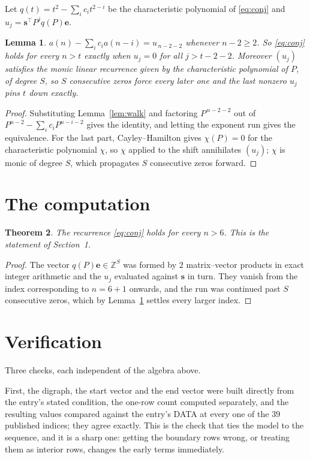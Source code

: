 \documentclass[11pt,a4paper]{article}
\theoremstyle{plain}
\newtheorem{theorem}{Theorem}
\newtheorem{lemma}[theorem]{Lemma}
\theoremstyle{definition}
\begin{document}
Let $q(t)=t^{2}-\sum_i c_i t^{2-i}$ be the characteristic polynomial of
\eqref{eq:conj} and $u_j=\mathbf{s}^{\!\top}P^{j}q(P)\mathbf{e}$.

\begin{lemma}\label{lem:crit}
$a(n)-\sum_i c_i a(n-i)=u_{\,n-2-2}$ whenever $n-2\ge2$. So \eqref{eq:conj}
holds for every $n>t$ exactly when $u_j=0$ for all $j>t-2-2$. Moreover $(u_j)$
satisfies the monic linear recurrence given by the characteristic polynomial of $P$, of
degree $S$, so $S$ consecutive zeros force every later one and the last nonzero $u_j$ pins
$t$ down exactly.
\end{lemma}

\begin{proof}
Substituting Lemma~\ref{lem:walk} and factoring $P^{\,n-2-2}$ out of
$P^{n-2}-\sum_i c_i P^{n-i-2}$ gives the identity, and letting the exponent run gives the
equivalence. For the last part, Cayley--Hamilton gives $\chi(P)=0$ for the characteristic
polynomial $\chi$, so $\chi$ applied to the shift annihilates $(u_j)$; $\chi$ is monic of
degree $S$, which propagates $S$ consecutive zeros forward.
\end{proof}

\section{The computation}

\begin{theorem}
The recurrence \eqref{eq:conj} holds for every $n>6$. This is the statement of
Section~1.
\end{theorem}

\begin{proof}
The vector $q(P)\mathbf{e}\in\mathbb{Z}^{S}$ was formed by $2$ matrix--vector
products in exact integer arithmetic and the $u_j$ evaluated against $\mathbf{s}$ in turn.
They vanish from the index corresponding to $n=6+1$ onwards, and the run was continued
past $S$ consecutive zeros, which by Lemma~\ref{lem:crit} settles every larger index.
\end{proof}

\section{Verification}

Three checks, each independent of the algebra above.

First, the digraph, the start vector and the end vector were built directly from the
entry's stated condition, the one-row count computed separately, and the resulting values
compared against the entry's DATA at every one of the $39$ published indices; they
agree exactly. This is the check that ties the model to the sequence, and it is a sharp one:
getting the boundary rows wrong, or treating them as interior rows, changes the early terms
immediately.
\end{document}

